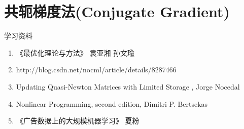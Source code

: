 \documentclass[10pt,a4paper]{ctexbook}
\begin{document}
\section{共轭梯度法(Conjugate Gradient)}


 
学习资料
\begin{enumerate}
\item《最优化理论与方法》 袁亚湘 孙文瑜
\item http://blog.csdn.net/nocml/article/details/8287466
\item Updating Quasi-Newton Matrices with Limited Storage , Jorge Nocedal
\item Nonlinear Programming, second edition, Dimitri P. Bertsekas
\item《广告数据上的大规模机器学习》  夏粉
\end{enumerate}

\ifx\mlbook\undefined
    
\end{document}
